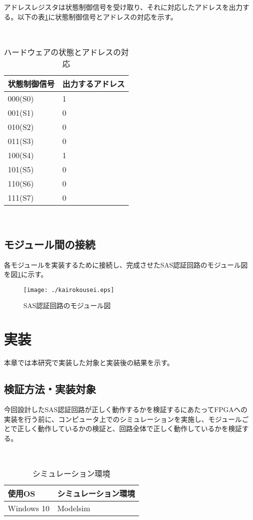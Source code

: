 \documentclass{thesis}
\begin{document}
アドレスレジスタは状態制御信号を受け取り、それに対応したアドレスを出力する。以下の表\ref{アドレス出力}に状態制御信号とアドレスの対応を示す。

\begin{table}[htb]
　\begin{center}
\caption{ハードウェアの状態とアドレスの対応}
\label{アドレス出力}
  \begin{tabular}{|p{3cm}|p{4cm}|} \hline
   状態制御信号 & 出力するアドレス  \\ \hline \hline
   000(S0)   &  1   \\ \hline
   001(S1)   &  0   \\ \hline
   010(S2)   &  0   \\ \hline
   011(S3)   &  0   \\ \hline
   100(S4)   &  1   \\ \hline
   101(S5)   &  0   \\ \hline
   110(S6)   &  0   \\ \hline
   111(S7)   &  0   \\ \hline
  \end{tabular}
  \end{center}
\end{table}　\\

\section{モジュール間の接続}
各モジュールを実装するために接続し、完成させたSAS認証回路のモジュール図を図\ref{モジュール図}に示す。
\begin{figure}[H]
 \center
 \texttt{[image: ./kairokousei.eps]}
 \caption{SAS認証回路のモジュール図}
 \label{モジュール図}
\end{figure}

\chapter{実装}

本章では本研究で実装した対象と実装後の結果を示す。
\section{検証方法・実装対象}
今回設計したSAS認証回路が正しく動作するかを検証するにあたってFPGAへの実装を行う前に、コンピュータ上でのシミュレーションを実施し、モジュールごとで正しく動作しているかの検証と、回路全体で正しく動作しているかを検証する。
\begin{table}[htb]
　\begin{center}
\caption{シミュレーション環境}
\label{シミュレーション環境}
  \begin{tabular}{|p{5cm}|p{5cm}|} \hline
  使用OS                & シミュレーション環境  \\ \hline \hline
 Windows 10  &  Modelsim  \\ \hline
  \end{tabular}
  \end{center}
\end{table}　\\
\end{document}
